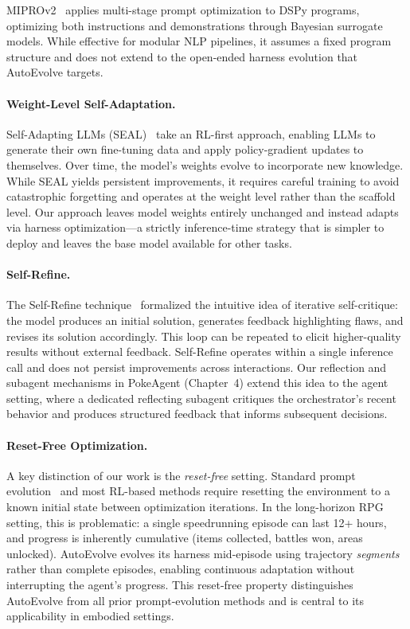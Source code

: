MIPROv2~\citep{opsahlong2024miprov2} applies multi-stage prompt optimization to DSPy programs, optimizing both instructions and demonstrations through Bayesian surrogate models. While effective for modular NLP pipelines, it assumes a fixed program structure and does not extend to the open-ended harness evolution that AutoEvolve targets.

\paragraph{Weight-Level Self-Adaptation.} Self-Adapting LLMs (SEAL)~\citep{zweiger2025seal} take an RL-first approach, enabling LLMs to generate their own fine-tuning data and apply policy-gradient updates to themselves. Over time, the model's weights evolve to incorporate new knowledge. While SEAL yields persistent improvements, it requires careful training to avoid catastrophic forgetting and operates at the weight level rather than the scaffold level. Our approach leaves model weights entirely unchanged and instead adapts via harness optimization---a strictly inference-time strategy that is simpler to deploy and leaves the base model available for other tasks.

\paragraph{Self-Refine.} The Self-Refine technique~\citep{madaan2023selfrefine} formalized the intuitive idea of iterative self-critique: the model produces an initial solution, generates feedback highlighting flaws, and revises its solution accordingly. This loop can be repeated to elicit higher-quality results without external feedback. Self-Refine operates within a single inference call and does not persist improvements across interactions. Our reflection and subagent mechanisms in PokeAgent (Chapter~4) extend this idea to the agent setting, where a dedicated reflecting subagent critiques the orchestrator's recent behavior and produces structured feedback that informs subsequent decisions.

\paragraph{Reset-Free Optimization.} A key distinction of our work is the \emph{reset-free} setting. Standard prompt evolution~\citep{agrawal2025gepa} and most RL-based methods require resetting the environment to a known initial state between optimization iterations. In the long-horizon RPG setting, this is problematic: a single speedrunning episode can last 12+ hours, and progress is inherently cumulative (items collected, battles won, areas unlocked). AutoEvolve evolves its harness mid-episode using trajectory \emph{segments} rather than complete episodes, enabling continuous adaptation without interrupting the agent's progress. This reset-free property distinguishes AutoEvolve from all prior prompt-evolution methods and is central to its applicability in embodied settings.

